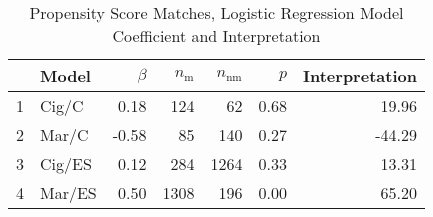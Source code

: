 \begin{table}[ht]
\centering
\begin{tabular}{rlrrrrr}
  \hline
 & \small Model & $\beta$ & $n_{\text{m}}$ & $n_{\text{nm}}$ & $p$ & \small Interpretation \\ 
  \hline
1 & Cig/C & 0.18 & 124 &  62 & 0.68 & 19.96 \\ 
  2 & Mar/C & -0.58 &  85 & 140 & 0.27 & -44.29 \\ 
  3 & Cig/ES & 0.12 & 284 & 1264 & 0.33 & 13.31 \\ 
  4 & Mar/ES & 0.50 & 1308 & 196 & 0.00 & 65.20 \\ 
   \hline
\end{tabular}
\caption{Propensity Score Matches, Logistic Regression Model Coefficient and Interpretation} 
\end{table}
